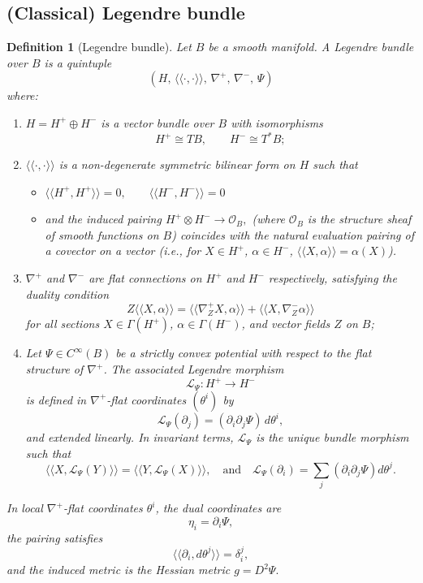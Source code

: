 \documentclass[12pt]{amsart}
\newtheorem{dfn}{Definition}
\begin{document}
\subsection{(Classical) Legendre bundle}
\begin{dfn}[Legendre bundle]\label{D:Legendre_Bundle}
Let $B$ be a smooth manifold. A \emph{Legendre bundle} over $B$ is a quintuple
\[
(H,\, \langle\!\langle \cdot, \cdot \rangle\!\rangle,\, \nabla^+,\, \nabla^-,\, \Psi)
\]
where:
\begin{enumerate}
    \item $H = H^+ \oplus H^-$ is a vector bundle over $B$ with isomorphisms 
    \[
    H^+ \cong TB, \qquad H^- \cong T^*B;
    \]
    
    \item $\langle\!\langle \cdot, \cdot \rangle\!\rangle$ is a non-degenerate symmetric bilinear form on $H$ such that \begin{itemize}
    \item $
    \langle\!\langle H^+, H^+ \rangle\!\rangle = 0, \qquad
    \langle\!\langle H^-, H^- \rangle\!\rangle = 0$
    \item  and the induced pairing $H^+ \otimes H^- \to \mathcal{O}_B,$ (where $\mathcal{O}_B$ is the structure sheaf of smooth functions on $B$) coincides with the natural evaluation pairing of a covector on a vector (i.e., for $X \in H^+$, $\alpha \in H^-$, $\langle\!\langle X, \alpha \rangle\!\rangle = \alpha(X)$).
    \end{itemize}
    \item $\nabla^+$ and $\nabla^-$ are flat connections on $H^+$ and $H^-$ respectively, satisfying the duality condition
    \[
    Z\langle\!\langle X, \alpha \rangle\!\rangle 
    =
    \langle\!\langle \nabla^+_Z X, \alpha \rangle\!\rangle 
    +
    \langle\!\langle X, \nabla^-_Z \alpha \rangle\!\rangle
    \]
    for all sections $X \in \Gamma(H^+)$, $\alpha \in \Gamma(H^-)$, and vector fields $Z$ on $B$;

    \item Let $\Psi \in C^\infty(B)$ be a strictly convex potential with respect to the flat structure of $\nabla^+$. The associated Legendre morphism
\[
\mathscr{L}_{\Psi} : H^+ \to H^-
\]
is defined in $\nabla^+$-flat coordinates $(\theta^i)$ by
\[
\mathscr{L}_{\Psi}(\partial_j) = (\partial_i \partial_j \Psi)\, d\theta^i,
\]
and extended linearly. In invariant terms, $\mathscr{L}_{\Psi}$ is the unique bundle morphism such that
\[
\langle\!\langle X,\mathscr{L}_{\Psi}(Y) \rangle\!\rangle
=
\langle\!\langle Y,\mathscr{L}_{\Psi}(X) \rangle\!\rangle, \quad \text{and} \quad \mathscr{L}_{\Psi}(\partial_i)=\sum_j(\partial_i\partial_j \Psi)d\theta^j.\] \end{enumerate}

In local $\nabla^+$-flat coordinates $\theta^i$, the dual coordinates are
\[
\eta_i = \partial_i \Psi,
\]
the pairing satisfies
\[
\langle\!\langle \partial_i, d\theta^j \rangle\!\rangle = \delta_i^j,
\]
and the induced metric is the Hessian metric $g = D^2 \Psi.$
\end{dfn}
\end{document}
